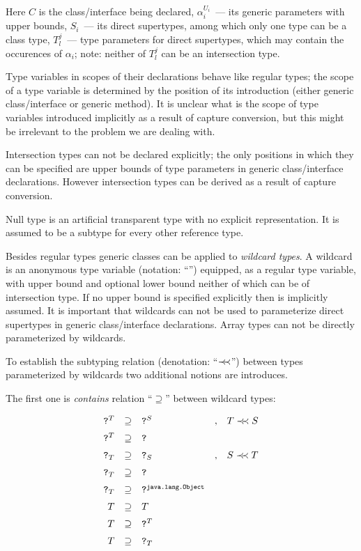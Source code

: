 Here $C$ is the class/interface being declared, $\alpha_i^{U_i}$~--- its generic parameters with upper
bounds, $S_i$~--- its direct supertypes, among which only one type can be a class type, $T^j_l$~--- type
parameters for direct supertypes, which may contain the occurences of $\alpha_i$; note: neither of $T^j_l$ can be
an intersection type.

Type variables in scopes of their declarations behave like regular types; the scope of a type variable is
determined by the position of its introduction (either generic class/interface or generic method). It
is unclear what is the scope of type variables introduced implicitly as a result of capture
conversion, but this might be irrelevant to the problem we are dealing with.

Intersection types can not be declared explicitly; the only positions in which they can be specified are
upper bounds of type parameters in generic class/interface declarations. However intersection types can be derived
as a result of capture conversion.

Null type is an artificial transparent type with no explicit representation. It is assumed to be a subtype for
every other reference type.

Besides regular types generic classes can be applied to \emph{wildcard types}. A wildcard is an anonymous
type variable (notation: ``'') equipped, as a regular type variable, with upper bound and optional lower bound
neither of which can be of intersection type. If no upper bound is specified explicitly then  is implicitly assumed.
It is important that wildcards can not be used to parameterize direct supertypes in generic class/interface declarations.
Array types can not be directly parameterized by wildcards.

To establish the subtyping relation (denotation: ``$\prec\mathrel{\mkern-5mu}\prec$'') between types parameterized by wildcards two additional
notions are introduces.

The first one is \emph{contains} relation ``$\supseteq$'' between wildcard types:

\[
\begin{array}{rclcl}
  \texttt{?}^T&\supseteq&\texttt{?}^S&,&T\prec\mathrel{\mkern-5mu}\prec S \\[2mm]
  \texttt{?}^T&\supseteq&\texttt{?}&& \\[2mm]
  \texttt{?}_T&\supseteq&\texttt{?}_S&,&S\prec\mathrel{\mkern-5mu}\prec T\\[2mm]
  \texttt{?}_T&\supseteq&\texttt{?}&& \\[2mm]
  \texttt{?}_T&\supseteq&\texttt{?}^{\texttt{java.lang.Object}}&& \\[2mm]
  T&\supseteq& T&&\\[2mm]
  T&\supseteq&\texttt{?}^T&&\\[2mm]
  T&\supseteq&\texttt{?}_T&&
\end{array}
\]

